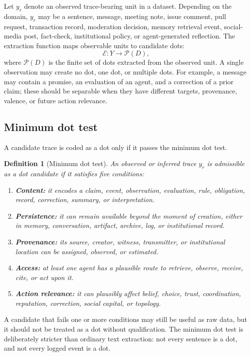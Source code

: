 \documentclass[11pt]{article}
\newtheorem{definition}{Definition}
\theoremstyle{remark}
\begin{document}
Let \(y_r\) denote an observed trace-bearing unit in a dataset. Depending
on the domain, \(y_r\) may be a sentence, message, meeting note, issue
comment, pull request, transaction record, moderation decision, memory
retrieval event, social-media post, fact-check, institutional policy, or
agent-generated reflection. The extraction function maps observable units
to candidate dots:
\[
\mathcal E:Y\rightarrow \mathcal P(D),
\]
where \(\mathcal P(D)\) is the finite set of dots extracted from the
observed unit. A single observation may create no dot, one dot, or
multiple dots. For example, a message may contain a promise, an evaluation
of an agent, and a correction of a prior claim; these should be separable
when they have different targets, provenance, valence, or future action
relevance.

\subsection{Minimum dot test}\label{minimum-dot-test}

A candidate trace is coded as a dot only if it passes the minimum
dot test.

\begin{definition}[Minimum dot test]
An observed or inferred trace \(y_r\) is admissible as a dot candidate if
it satisfies five conditions:
\begin{enumerate}[leftmargin=*]
\item \textbf{Content:} it encodes a claim, event, observation,
evaluation, rule, obligation, record, correction, summary, or
interpretation.
\item \textbf{Persistence:} it can remain available beyond the moment of
creation, either in memory, conversation, artifact, archive, log, or
institutional record.
\item \textbf{Provenance:} its source, creator, witness, transmitter, or
institutional location can be assigned, observed, or estimated.
\item \textbf{Access:} at least one agent has a plausible route to
retrieve, observe, receive, cite, or act upon it.
\item \textbf{Action relevance:} it can plausibly affect belief, choice,
trust, coordination, reputation, correction, social capital, or topology.
\end{enumerate}
\end{definition}

A candidate that fails one or more conditions may still be useful as raw
data, but it should not be treated as a dot without qualification. The
minimum dot test is deliberately stricter than ordinary text extraction:
not every sentence is a dot, and not every logged event is a dot.
\end{document}
